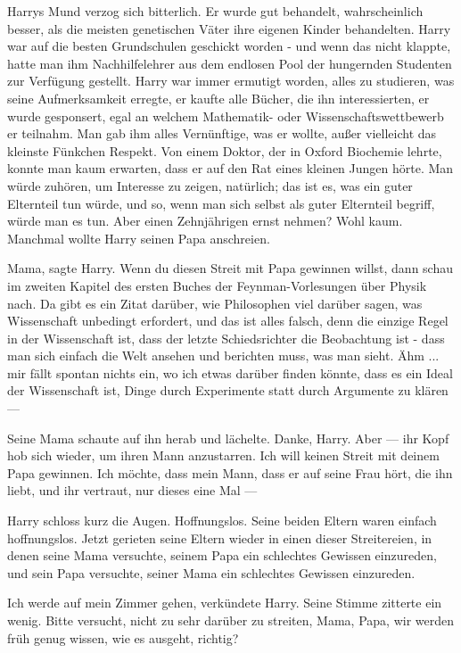 Harrys Mund verzog sich bitterlich. Er wurde gut behandelt, wahrscheinlich
besser, als die meisten genetischen Väter ihre eigenen Kinder behandelten. Harry
war auf die besten Grundschulen geschickt worden - und wenn das nicht klappte,
hatte man ihm Nachhilfelehrer aus dem endlosen Pool der hungernden Studenten zur
Verfügung gestellt. Harry war immer ermutigt worden, alles zu studieren, was
seine Aufmerksamkeit erregte, er kaufte alle Bücher, die ihn interessierten, er
wurde gesponsert, egal an welchem Mathematik- oder Wissenschaftswettbewerb er
teilnahm. Man gab ihm alles Vernünftige, was er wollte, außer vielleicht das
kleinste Fünkchen Respekt. Von einem Doktor, der in Oxford Biochemie lehrte,
konnte man kaum erwarten, dass er auf den Rat eines kleinen Jungen hörte. Man
würde zuhören, um Interesse zu zeigen, natürlich; das ist es, was ein guter
Elternteil tun würde, und so, wenn man sich selbst als guter Elternteil begriff,
würde man es tun. Aber einen Zehnjährigen ernst nehmen? Wohl kaum. Manchmal
wollte Harry seinen Papa anschreien.

\glqq{}Mama\grqq{}, sagte Harry. \glqq{}Wenn du diesen Streit mit Papa gewinnen
willst, dann schau im zweiten Kapitel des ersten Buches der Feynman-Vorlesungen
über Physik nach. Da gibt es ein Zitat darüber, wie Philosophen viel darüber
sagen, was Wissenschaft unbedingt erfordert, und das ist alles falsch, denn die
einzige Regel in der Wissenschaft ist, dass der letzte Schiedsrichter die
Beobachtung ist - dass man sich einfach die Welt ansehen und berichten muss, was
man sieht. Ähm ... mir fällt spontan nichts ein, wo ich etwas darüber finden
könnte, dass es ein Ideal der Wissenschaft ist, Dinge durch Experimente statt
durch Argumente zu klären ---\grqq{}

Seine Mama schaute auf ihn herab und lächelte. \glqq{}Danke, Harry. Aber
---\grqq{} ihr Kopf hob sich wieder, um ihren Mann anzustarren. \glqq{}Ich will
keinen Streit mit deinem Papa gewinnen. Ich möchte, dass mein Mann, dass er auf
seine Frau hört, die ihn liebt, und ihr vertraut, nur dieses eine Mal ---\grqq{}

Harry schloss kurz die Augen. Hoffnungslos. Seine beiden Eltern waren einfach
hoffnungslos. Jetzt gerieten seine Eltern wieder in einen dieser Streitereien,
in denen seine Mama versuchte, seinem Papa ein schlechtes Gewissen
einzureden, und sein Papa versuchte, seiner Mama ein schlechtes Gewissen
einzureden.

\glqq{}Ich werde auf mein Zimmer gehen\grqq{}, verkündete Harry. Seine Stimme
zitterte ein wenig. \glqq{}Bitte versucht, nicht zu sehr darüber zu streiten,
Mama, Papa, wir werden früh genug wissen, wie es ausgeht, richtig?\grqq{}

